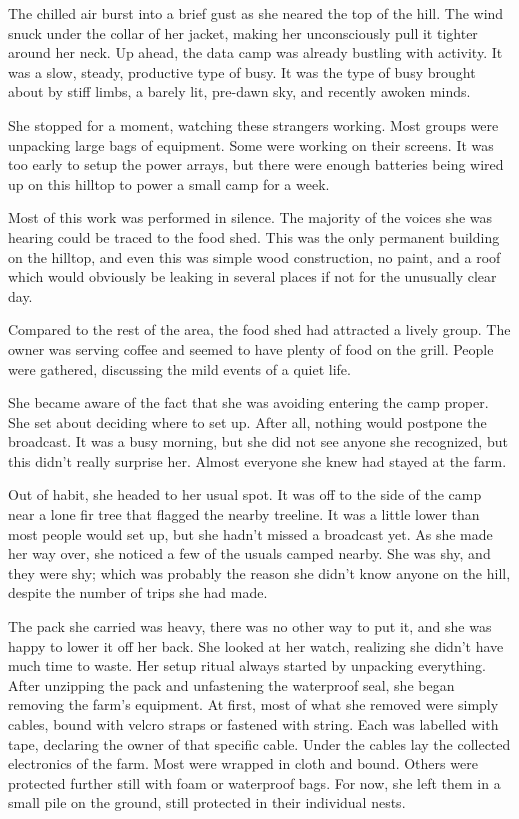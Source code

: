 The chilled air burst into a brief gust as she neared the top of the hill.
The wind snuck under the collar of her jacket, making her unconsciously
pull it tighter around her neck. Up ahead, the data camp was already bustling with activity. It was a slow,
steady, productive type of busy. It was the type of busy brought about by
stiff limbs, a barely lit, pre-dawn sky, and recently awoken minds.

She stopped for a moment, watching these strangers working. Most groups were unpacking
large bags of equipment. Some were working on their screens. It was too early
to setup the power arrays, but there were enough batteries being wired up on this hilltop
to power a small camp for a week.

Most of this work was performed in silence. The majority of the voices she
was hearing could be traced to the food shed. This was the only permanent
building on the hilltop, and even this was simple wood construction, no
paint, and a roof which would obviously be leaking in several places if not
for the unusually clear day.

Compared to the rest of the area, the food shed had attracted a lively group.
The owner was serving coffee and seemed to have plenty of food on the grill.
People were gathered, discussing the mild events of a quiet life.

She became aware of the fact that she was avoiding entering the camp proper.
She set about deciding where to set up. After all, nothing would postpone the
broadcast. It was a busy morning, but she did not see anyone she recognized, but
this didn't really surprise her. Almost everyone she knew had stayed at the
farm.

Out of habit, she headed to her usual spot. It was off to the side of the camp
near a lone fir tree that flagged the nearby treeline. It was a little lower than
most people would set up, but she hadn't missed a broadcast yet. As she made her
way over, she noticed a few of the usuals camped nearby. She was shy, and they
were shy; which was probably the reason she didn't know anyone on the hill,
despite the number of trips she had made.

The pack she carried was heavy, there was no other way to put it, and she was
happy to lower it off her back. She looked at her watch, realizing she didn't
have much time to waste. Her setup ritual always started by unpacking everything.
After unzipping the pack and unfastening the waterproof seal, she began removing
the farm's equipment. At first, most of what she removed were simply cables,
bound with velcro straps or fastened with string. Each was labelled with tape,
declaring the owner of that specific cable. Under the cables lay the collected
electronics of the farm. Most were wrapped in cloth and bound. Others were
protected further still with foam or waterproof bags. For now, she left them
in a small pile on the ground, still protected in their individual nests.

